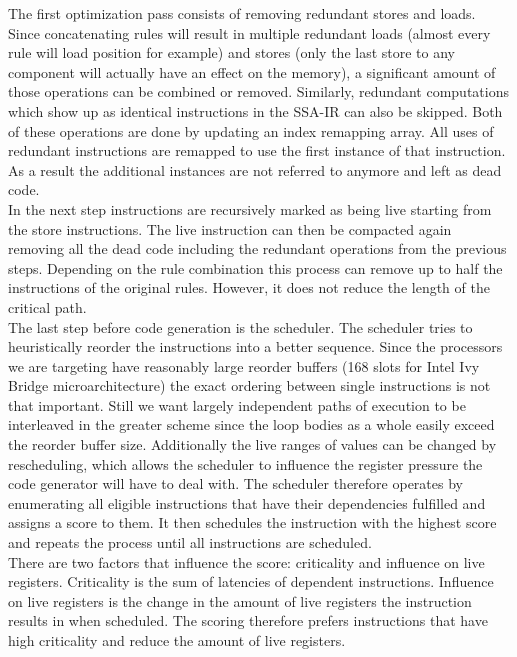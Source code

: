The first optimization pass consists of removing redundant stores and loads. Since concatenating rules will result in multiple redundant loads (almost every rule will load position for example) and stores (only the last store to any component will actually have an effect on the memory), a significant amount of those operations can be combined or removed. Similarly, redundant computations which show up as identical instructions in the SSA-IR can also be skipped. Both of these operations are done by updating an index remapping array. All uses of redundant instructions are remapped to use the first instance of that instruction. As a result the additional instances are not referred to anymore and left as dead code.\\
In the next step instructions are recursively marked as being live starting from the store instructions. The live instruction can then be compacted again removing all the dead code including the redundant operations from the previous steps. Depending on the rule combination this process can remove up to half the instructions of the original rules. However, it does not reduce the length of the critical path.\\
The last step before code generation is the scheduler. The scheduler tries to heuristically reorder the instructions into a better sequence. Since the processors we are targeting have reasonably large reorder buffers (168 slots for Intel Ivy Bridge microarchitecture) the exact ordering between single instructions is not that important. Still we want largely independent paths of execution to be interleaved in the greater scheme since the loop bodies as a whole easily exceed the reorder buffer size. Additionally the live ranges of values can be changed by rescheduling, which allows the scheduler to influence the register pressure the code generator will have to deal with.
The scheduler therefore operates by enumerating all eligible instructions that have their dependencies fulfilled and assigns a score to them. It then schedules the instruction with the highest score and repeats the process until all instructions are scheduled. \\
There are two factors that influence the score: criticality and influence on live registers. Criticality is the sum of latencies of dependent instructions. Influence on live registers is the change in the amount of live registers the instruction results in when scheduled. The scoring therefore prefers instructions that have high criticality and reduce the amount of live registers.

